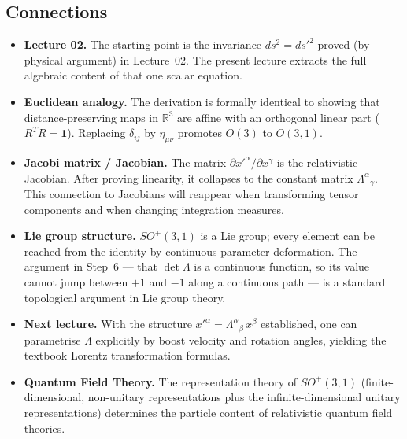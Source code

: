 
\subsection*{Connections}

\begin{itemize}
  \item \textbf{Lecture 02.}  The starting point is the invariance
    $ds^2 = ds'^2$ proved (by physical argument) in Lecture~02.  The
    present lecture extracts the full algebraic content of that one
    scalar equation.

  \item \textbf{Euclidean analogy.}  The derivation is formally
    identical to showing that distance-preserving maps in $\mathbb{R}^3$
    are affine with an orthogonal linear part ($R^T R = \mathbf{1}$).
    Replacing $\delta_{ij}$ by $\eta_{\mu\nu}$ promotes $O(3)$ to
    $O(3,1)$.

  \item \textbf{Jacobi matrix / Jacobian.}  The matrix
    $\partial x'^\alpha/\partial x^\gamma$ is the relativistic Jacobian.
    After proving linearity, it collapses to the constant matrix
    $\Lambda^\alpha{}_\gamma$.  This connection to Jacobians will reappear
    when transforming tensor components and when changing integration
    measures.

  \item \textbf{Lie group structure.}  $SO^+(3,1)$ is a Lie group;
    every element can be reached from the identity by continuous
    parameter deformation.  The argument in Step~6 — that
    $\det\Lambda$ is a continuous function, so its value cannot jump
    between $+1$ and $-1$ along a continuous path — is a standard
    topological argument in Lie group theory.

  \item \textbf{Next lecture.}  With the structure
    $x'^\alpha = \Lambda^\alpha{}_\beta\,x^\beta$ established, one can
    parametrise $\Lambda$ explicitly by boost velocity and rotation
    angles, yielding the textbook Lorentz transformation formulas.

  \item \textbf{Quantum Field Theory.}  The representation theory of
    $SO^+(3,1)$ (finite-dimensional, non-unitary representations plus
    the infinite-dimensional unitary representations) determines the
    particle content of relativistic quantum field theories.
\end{itemize}

